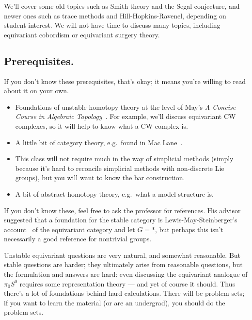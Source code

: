 We'll cover some old topics such as Smith theory and the Segal conjecture, and newer ones such as trace methods
and Hill-Hopkins-Ravenel, depending on student interest. We will not have time to discuss many topics, including
equivariant cobordism or equivariant surgery theory.
\subsection*{Prerequisites.} If you don't know these prerequisites, that's okay; it means you're willing to read
about it on your own.
\begin{itemize}
	\item Foundations of unstable homotopy theory at the level of May's \textit{A Concise Course in Algebraic
	Topology}~\cite{ConciseCourse}. For example, we'll discuss equivariant CW complexes, so it will help to know
	what a CW complex is.
	\item A little bit of category theory, e.g.\ found in Mac Lane~\cite{MacLane}.
	\item This class will not require much in the way of simplicial methods (simply because it's hard to reconcile
	simplicial methods with non-discrete Lie groups), but you will want to know the bar construction.
	\item A bit of abstract homotopy theory, e.g.\ what a model structure is.
\end{itemize}
If you don't know these, feel free to ask the professor for references. His advisor suggested that a foundation for
the stable category is Lewis-May-Steinberger's account~\cite{LMS} of the equivariant category and let $G = *$, but
perhaps this isn't necessarily a good reference for nontrivial groups.

Unstable equivariant questions are very natural, and somewhat reasonable. But stable questions are harder; they
ultimately arise from reasonable questions, but the formulation and answers are hard: even discussing the
equivariant analogue of $\pi_0S^0$ requires some representation theory --- and yet of course it should. Thus
there's a lot of foundations behind hard calculations. There will be problem sets; if you want to learn the
material (or are an undergrad), you should do the problem sets.
